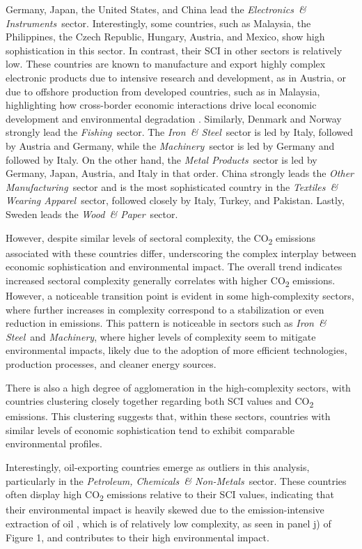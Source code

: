 \documentclass[10pt]{article}
\newcommand{\EL}{\textit{Electronics~\& Instruments}}
\newcommand{\FI}{\textit{Fishing}}
\newcommand{\IR}{\textit{Iron~\& Steel}}
\newcommand{\MA}{\textit{Machinery}}
\newcommand{\ME}{\textit{Metal Products}}
\newcommand{\OT}{\textit{Other Manufacturing}}
\newcommand{\PE}{\textit{Petroleum, Chemicals~\& Non-Metals}}
\newcommand{\TE}{\textit{Textiles~\& Wearing Apparel}}
\newcommand{\WO}{\textit{Wood~\& Paper}}
\begin{document}
Germany, Japan, the United States, and China lead the \EL\ sector. Interestingly, some countries, such as Malaysia, the Philippines, the Czech Republic, Hungary, Austria, and Mexico, show high sophistication in this sector. In contrast, their SCI in other sectors is relatively low. These countries are known to manufacture and export highly complex electronic products due to intensive research and development, as in Austria, or due to offshore production from developed countries, such as in Malaysia, highlighting how cross-border economic interactions drive local economic development and environmental degradation \citep{balsa-barreiroGlobalizationShiftingCenters2019}. Similarly, Denmark and Norway strongly lead the \FI\ sector. The \IR\ sector is led by Italy, followed by Austria and Germany, while the \MA\ sector is led by Germany and followed by Italy.
On the other hand, the \ME\ sector is led by Germany, Japan, Austria, and Italy in that order. China strongly leads the \OT\ sector and is the most sophisticated country in the \TE\ sector, followed closely by Italy, Turkey, and Pakistan. Lastly, Sweden leads the \WO\ sector.

However, despite similar levels of sectoral complexity, the CO\textsubscript{2} emissions associated with these countries differ, underscoring the complex interplay between economic sophistication and environmental impact. The overall trend indicates increased sectoral complexity generally correlates with higher CO\textsubscript{2} emissions. However, a noticeable transition point is evident in some high-complexity sectors, where further increases in complexity correspond to a stabilization or even reduction in emissions. This pattern is noticeable in sectors such as \IR\ and \MA, where higher levels of complexity seem to mitigate environmental impacts, likely due to the adoption of more efficient technologies, production processes, and cleaner energy sources.

There is also a high degree of agglomeration in the high-complexity sectors, with countries clustering closely together regarding both SCI values and CO\textsubscript{2} emissions. This clustering suggests that, within these sectors, countries with similar levels of economic sophistication tend to exhibit comparable environmental profiles.

Interestingly, oil-exporting countries emerge as outliers in this analysis, particularly in the \PE\ sector. These countries often display high CO\textsubscript{2} emissions relative to their SCI values, indicating that their environmental impact is heavily skewed due to the emission-intensive extraction of oil \citep{IEAOilExtraction}, which is of relatively low complexity, as seen in panel j) of Figure 1, and contributes to their high environmental impact.
\end{document}
